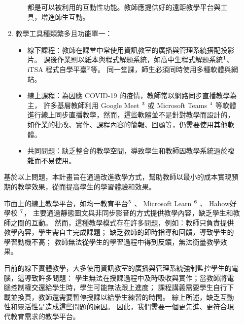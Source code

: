 \documentclass[12pt]{article}
\begin{document}
\begin{enumerate}
\begin{enumerate}
\begin{itemize}
          都是可以被利用的互動性功能。教師應提供好的遠距教學平台與工具，增進師生互動\cite{ref4}。
        \end{itemize}
      \item 教學工具種類繁多且功能單一：
        \begin{itemize}
          \item 線下課程：教師在課堂中常使用資訊教室的廣播與管理系統搭配投影片。
          課後作業則以紙本與程式解題系統，如高中生程式解題系統$\footnote{https://zerojudge.tw/}$、
           iTSA 程式自學平臺$\footnote{https://e-tutor.itsa.org.tw/e-Tutor/}$等。
          同一堂課，師生必須同時使用多種軟體與網站。
          \item 線上課程：為因應 COVID-19 的疫情，教師常以網路同步直播教學為主，
          許多基層教師利用 Google Meet $\footnote{https://meet.google.com/}$
          或 Microsoft Teams $\footnote{https://www.microsoft.com/zh-tw/microsoft-teams/}$
          等軟體進行線上同步直播教學，然而，這些軟體並不是針對教學而設計的，
          如作業的批改、實作、課程內容的簡報、回顧等，仍需要使用其他軟體。
          \item 共同問題：缺乏整合的教學空間，導致學生和教師因教學系統過於複雜而不易使用。
        \end{itemize}
    \end{enumerate}
    \par 基於以上問題，本計畫旨在通過改進教學方式，幫助教師以最小的成本實現預期的教學效果，從而提高學生的學習體驗和效果。
    
    \par 市面上的線上教學平台，如均一教育平台$\footnote{https://www.junyiacademy.org/}$
    、 Microsoft Learn $\footnote{https://learn.microsoft.com/zh-tw/}$
    、 Hahow好學校 $\footnote{https://hahow.in/}$，
    主要通過靜態圖文與非同步影音的方式提供教學內容，缺乏學生和教師之間的互動。
    然而，這種教學模式存在許多問題，例如：教師只負責提供教學內容，學生需自主完成課題；
    缺乏教師的即時指導和回饋，導致學生的學習動機不高；
    教師無法從學生的學習過程中得到反饋，無法衡量教學效果\cite{ref4}。
    
    \par 目前的線下實體教學，大多使用資訊教室的廣播與管理系統強制監控學生的電腦，這導致許多問題：
    學生無法在授課過程中及時吸收與實作；當教師將電腦控制權交還給學生時，學生可能無法跟上進度；
    課程講義需要學生自行下載並換頁，教師還需要暫停授課以給學生練習的時間。
    綜上所述，缺乏互動性和靈活性是造成這些問題的原因。
    因此，我們需要一個更先進、更符合現代教育需求的教學平台。


\end{enumerate}
\end{document}
